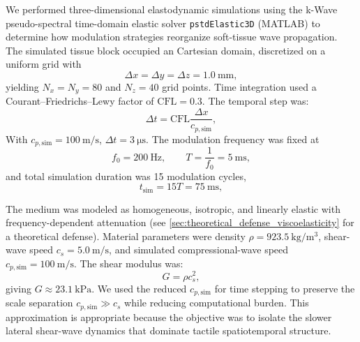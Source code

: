 \documentclass[pdflatex, sn-nature]{sn-jnl}
\theoremstyle{thmstyleone}%
\theoremstyle{thmstyletwo}%
\theoremstyle{thmstylethree}%
\begin{document}
We performed three-dimensional elastodynamic simulations using the k-Wave pseudo-spectral time-domain elastic solver \texttt{pstdElastic3D} (MATLAB) to determine how modulation strategies reorganize soft-tissue wave propagation. The simulated tissue block occupied an  Cartesian domain, discretized on a uniform grid with
\begin{equation}
    \Delta x = \Delta y = \Delta z = \qty{1.0}{\milli\meter},
\end{equation}
yielding $N_x=N_y=80$ and $N_z=40$ grid points. Time integration used a Courant--Friedrichs--Lewy factor of $\mathrm{CFL}=0.3$. The temporal step was:
\begin{equation}
    \Delta t = \mathrm{CFL}\frac{\Delta x}{c_{p,\mathrm{sim}}},
\end{equation}
With $c_{p,\mathrm{sim}}=\qty{100}{\meter\per\second}$, $\Delta t=\qty{3}{\micro\second}$. The modulation frequency was fixed at
\begin{equation}
    f_0 = \qty{200}{\hertz},
    \qquad
    T = \frac{1}{f_0} = \qty{5}{\milli\second},
\end{equation}
and total simulation duration was 15 modulation cycles,
\begin{equation}
    t_{\mathrm{sim}} = 15T = \qty{75}{\milli\second},
\end{equation}

The medium was modeled as homogeneous, isotropic, and linearly elastic with frequency-dependent attenuation (see \cref{sec:theoretical_defense_viscoelasticity} for a theoretical defense). Material parameters were density $\rho=\qty{923.5}{\kilo\gram\per\cubic\meter}$, shear-wave speed $c_s=\qty{5.0}{\meter\per\second}$, and simulated compressional-wave speed $c_{p,\mathrm{sim}}=\qty{100}{\meter\per\second}$. The shear modulus was:
\begin{equation}
    G = \rho c_s^2,
\end{equation}
giving $G\approx \qty{23.1}{\kilo\pascal}$. We used the reduced $c_{p,\mathrm{sim}}$ for time stepping to preserve the scale separation $c_{p,\mathrm{sim}} \gg c_s$ while reducing computational burden. This approximation is appropriate because the objective was to isolate the slower lateral shear-wave dynamics that dominate tactile spatiotemporal structure.
\end{document}
